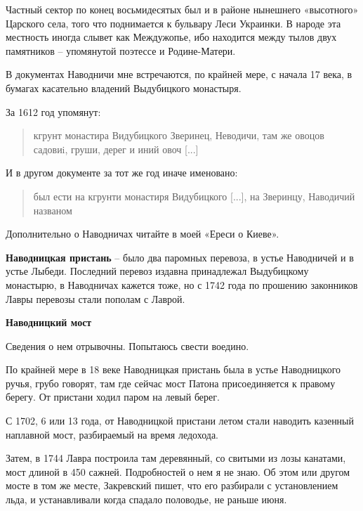 Частный сектор по конец восьмидесятых был и в районе нынешнего «высотного» Царского села, того что поднимается к бульвару Леси Украинки. В народе эта местность иногда слывет как Междужопье, ибо находится между тылов двух памятников – упомянутой поэтессе и Родине-Матери.

В документах Наводничи мне встречаются, по крайней мере, с начала 17 века, в бумагах касательно владений Выдубицкого монастыря. 

За 1612 год упомянут:

\begin{quotation}
кгрунт монастира Видубицкого Зверинец, Неводичи, там же овоцов садовиi, груши, дерег и иний овоч [...]  
\end{quotation}

И в другом документе за тот же год иначе именовано:

\begin{quotation}
был ести на кгрунти монастиря Видубицкого [...], на Зверинцу, Наводичий названом\end{quotation}

Дополнительно о Наводничах читайте в моей «Ереси о Киеве».\\

\medskip

\textbf{Наводницкая пристань} – было два паромных перевоза, в устье Наводничей и в устье Лыбеди. Последний перевоз издавна принадлежал Выдубицкому монастырю, в Наводничах кажется тоже, но с 1742 года по прошению законников Лавры перевозы стали пополам с Лаврой.\\

\medskip

\textbf{Наводницкий мост} 

Сведения о нем отрывочны. Попытаюсь свести воедино.

По крайней мере в 18 веке Наводницкая пристань была в устье Наводницкого ручья, грубо говорят, там где сейчас мост Патона присоединяется к правому берегу. От пристани ходил паром на левый берег.

С 1702, 6 или 13 года, от Наводницкой пристани летом стали наводить казенный наплавной мост, разбираемый на время ледохода. 

Затем, в 1744 Лавра построила там деревянный, со свитыми из лозы канатами, мост длиной в 450 сажней. Подробностей о нем я не знаю. Об этом или другом мосте в том же месте, Закревский пишет, что его разбирали с установлением льда, и устанавливали когда спадало половодье, не раньше июня.

